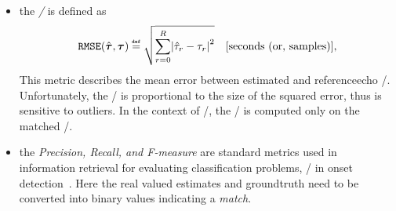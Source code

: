 \begin{itemize}
    \item the \textit{\RMSEtxt/} is defined as
    \begin{equation}
        \RMSE(\hat{\boldsymbol{\tau}}, \boldsymbol{\tau}) \eqdef \sqrt{\sum_{\idxEch=0}^{\numEchs} \abs{\hat{\tau}_\idxEch - \tau_\idxEch}^2} \quad \text{[seconds (or, samples)]}
        ,
    \end{equation}
    This metric describes the mean error between estimated and referenceecho \TOAs/.
    Unfortunately, the \RMSEtxt/ is proportional to the size of the squared error, thus is sensitive to outliers.
    In the context of \AER/, the \RMSEtxt/ is computed only on the matched \TOAs/.

    \item the \textit{Precision, Recall, and F-measure} are standard metrics used in information retrieval for evaluating classification problems, \eg/ in onset detection~.
    Here the real valued estimates and groundtruth need to be converted into binary values indicating a \textit{match}.
\end{itemize}
